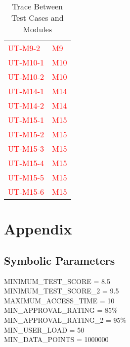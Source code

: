 \documentclass[12pt, titlepage]{article}
\begin{document}
\begin{table}[H]
\begin{tabular}{p{} p{}}
            \textcolor{red}{UT-M9-2} & \textcolor{red}{M9}\\
            \textcolor{red}{UT-M10-1} & \textcolor{red}{M10}\\
            \textcolor{red}{UT-M10-2} & \textcolor{red}{M10}\\
            \textcolor{red}{UT-M14-1} & \textcolor{red}{M14}\\
            \textcolor{red}{UT-M14-2} & \textcolor{red}{M14}\\
            \textcolor{red}{UT-M15-1} & \textcolor{red}{M15}\\
            \textcolor{red}{UT-M15-2} & \textcolor{red}{M15}\\
            \textcolor{red}{UT-M15-3} & \textcolor{red}{M15}\\
            \textcolor{red}{UT-M15-4} & \textcolor{red}{M15}\\
            \textcolor{red}{UT-M15-5} & \textcolor{red}{M15}\\
            \textcolor{red}{UT-M15-6} & \textcolor{red}{M15}\\
		\bottomrule
	\end{tabular}
	\caption{Trace Between Test Cases and Modules}
	\label{TblRT}
\end{table}





\newpage

\section{Appendix}


\subsection{Symbolic Parameters}

\noindent MINIMUM\_TEST\_SCORE = \hypertarget{MINIMUM_TEST_SCORE}{8.5}\\
MINIMUM\_TEST\_SCORE\_2 = \hypertarget{MINIMUM_TEST_SCORE_2}{9.5}\\
MAXIMUM\_ACCESS\_TIME = \hypertarget{MAXIMUM_ACCESS_TIME}{10}\\
MIN\_APPROVAL\_RATING = \hypertarget{MIN_APPROVAL_RATING}{85\%}\\
MIN\_APPROVAL\_RATING\_2 = \hypertarget{MIN_APPROVAL_RATING_2}{95\%}\\
MIN\_USER\_LOAD = \hypertarget{MIN_USER_LOAD}{50}\\
MIN\_DATA\_POINTS = \hypertarget{MIN_DATA_POINTS}{1000000}
\end{document}
